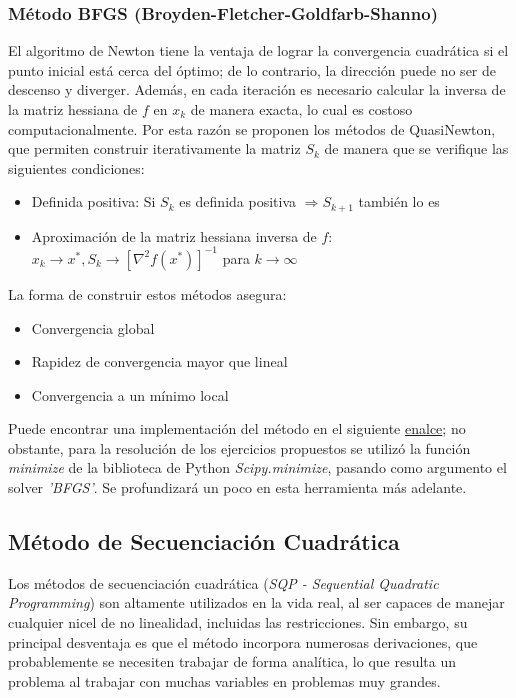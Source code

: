 \documentclass[titlepage, 11pt]{scrartcl}
\begin{document}
	\subsubsection{Método BFGS (Broyden-Fletcher-Goldfarb-Shanno)}
		El algoritmo de Newton tiene la ventaja de lograr la convergencia cuadrática si el punto inicial está cerca del óptimo; de lo contrario, la dirección puede no ser de descenso y diverger. Además, en cada iteración es necesario calcular la inversa de la matriz hessiana de $f$ en $x_k$ de manera exacta, lo cual es costoso computacionalmente. Por esta razón se proponen los métodos de QuasiNewton, que permiten construir iterativamente la matriz $S_k$ de manera que se verifique las siguientes condiciones:
		\begin{itemize}
			\item Definida positiva: Si $S_k$ es definida positiva $\Rightarrow S_{k+1}$ también lo es
			\item Aproximación de la matriz hessiana inversa de $f$: $x_k \rightarrow x^*, S_k \rightarrow [\nabla^2f(x^*)]^{-1}$ para $k \rightarrow \infty$
		\end{itemize}
	
		La forma de construir estos métodos asegura:
		\begin{itemize}
			\item Convergencia global
			\item Rapidez de convergencia mayor que lineal
			\item Convergencia a un mínimo local
		\end{itemize}
		Puede encontrar una implementación del método en el siguiente \href{methods.py}{enalce}; no obstante, para la resolución de los ejercicios propuestos se utilizó la función \textit{minimize} de la biblioteca de Python \textit{Scipy.minimize}, pasando como argumento el solver \textit{'BFGS'}. Se profundizará un poco en esta herramienta más adelante.
		
	\subsection{Método de Secuenciación Cuadrática}
	Los métodos de secuenciación cuadrática (\textit{SQP - Sequential Quadratic Programming}) son altamente utilizados en la vida real, al ser capaces de manejar cualquier nicel de no linealidad, incluidas las restricciones. Sin embargo, su principal desventaja es que el método incorpora numerosas derivaciones, que probablemente se necesiten trabajar de forma analítica, lo que resulta un problema al trabajar con muchas variables en problemas muy grandes.
	
\end{document}
